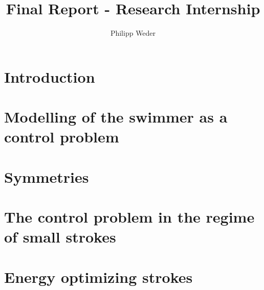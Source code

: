 \documentclass[11pt,a4paper]{article}
\author{Philipp Weder}
\title{\textbf{Final Report - Research Internship}}
\date{}
\theoremstyle{plain}
\theoremstyle{plain}
\theoremstyle{plain}
\theoremstyle{definition}
\theoremstyle{definition}
\theoremstyle{definition}
\theoremstyle{plain}
\begin{document}
\linespread{1.05}
\maketitle

\section{Introduction}


\section{Modelling of the swimmer as a control problem}


\section{Symmetries}


\section{The control problem in the regime of small strokes}


\section{Energy optimizing strokes}

\end{document}

